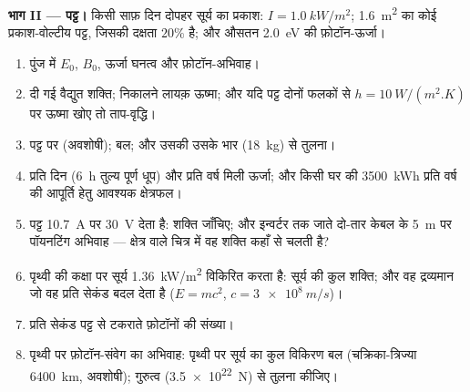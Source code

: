 \begin{problem}[{सप्ताहांत समस्या --- विद्युत्चुंबकीय ऊर्जा का पीछा:
किसी विद्युत-लाइन से किसी घर तक, सूर्य से किसी सौर पट्ट तक,
और किसी मैग्नेट्रॉन से पानी के किसी प्याले तक}]
\medskip
\noindent\textbf{भाग II --- पट्ट।}
किसी साफ़ दिन दोपहर सूर्य का प्रकाश: $I = \qty{1.0}{kW/m^2}$; \qty{1.6}{m^2} का
कोई प्रकाश-वोल्टीय पट्ट, जिसकी दक्षता $20\%$ है; और औसतन \qty{2.0}{eV}
की फ़ोटॉन-ऊर्जा।
\begin{enumerate}[resume]
  \item पुंज में $E_0$, $B_0$, ऊर्जा घनत्व और फ़ोटॉन-अभिवाह।
  \item दी गई वैद्युत शक्ति; निकालने लायक़ ऊष्मा; और यदि पट्ट दोनों फलकों से
        $h = \qty{10}{W/(m^2.K)}$ पर ऊष्मा खोए तो ताप-वृद्धि।
  \item पट्ट पर  (अवशोषी); बल; और उसकी
        उसके भार (\qty{18}{kg}) से तुलना।
  \item प्रति दिन (\qty{6}{h} तुल्य पूर्ण धूप) और प्रति वर्ष मिली ऊर्जा;
        और किसी घर की \qty{3500}{kWh} प्रति वर्ष की आपूर्ति हेतु आवश्यक
        क्षेत्रफल।
  \item पट्ट \qty{10.7}{A} पर \qty{30}{V} देता है: शक्ति जाँचिए;
        और इन्वर्टर तक जाते दो-तार केबल के \qty{5}{m} पर पॉयनटिंग
        अभिवाह --- क्षेत्र वाले चित्र में वह शक्ति कहाँ से
        चलती है?
  \item पृथ्वी की कक्षा पर सूर्य \qty{1.36}{kW/m^2} विकिरित करता है: सूर्य की
        कुल शक्ति; और वह द्रव्यमान जो वह प्रति सेकंड बदल देता है ($E = mc^2$,
        $c = \qty{3e8}{m/s}$)।
  \item प्रति सेकंड पट्ट से टकराते फ़ोटॉनों की संख्या।
  \item पृथ्वी पर फ़ोटॉन-संवेग का अभिवाह: पृथ्वी पर सूर्य का कुल
        विकिरण बल (चक्रिका-त्रिज्या \qty{6400}{km}, अवशोषी);
        गुरुत्व (\qty{3.5e22}{N}) से तुलना कीजिए।
\end{enumerate}


\end{problem}
